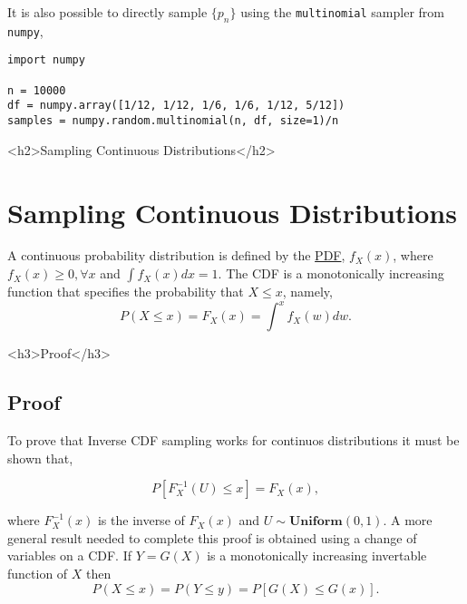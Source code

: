\documentclass[12pt]{article}
\begin{document}
\iftex
It is also possible to directly sample $\{p_n\}$ using the \texttt{multinomial} sampler from
\texttt{numpy},

\begin{verbatim}
import numpy

n = 10000
df = numpy.array([1/12, 1/12, 1/6, 1/6, 1/12, 5/12])
samples = numpy.random.multinomial(n, df, size=1)/n
\end{verbatim}
\fi

\ifblog
<h2>Sampling Continuous Distributions</h2>
\fi
\iftex
\section{Sampling Continuous Distributions}
\fi

A continuous probability distribution is defined by the  \href{https://en.wikipedia.org/wiki/Probability_density_function}{PDF},
$f_X(x)$, where $f_X(x) \geq 0, \forall x$ and $\int f_X(x) dx = 1.$ The CDF is a monotonically increasing function
that specifies the probability that $X \leq x$, namely,
\begin{equation}
\label{eq:continuous_cdf}
P(X \leq x) = F_X(x) = \int^{x} f_X(w) dw.
\end{equation}

\ifblog
<h3>Proof</h3>
\fi
\iftex
\subsection{Proof}
\fi

To prove that Inverse CDF sampling works for continuos distributions it must be shown that,

\begin{equation}
\label{eq:continuous_proof}
P[F_X^{-1}(U) \leq x] = F_X(x),
\end{equation}

where $F_X^{-1}(x)$ is the inverse of $F_X(x)$ and $U \sim \textbf{Uniform}(0, 1)$. A more general result needed to complete
this proof is obtained using a change of variables on a CDF. If $Y=G(X)$ is a monotonically increasing invertable function of $X$ then
\begin{equation}
\label{eq:CDF_invariance}
P(X \leq x) = P(Y \leq y) = P[G(X) \leq G(x)].
\end{equation}
\end{document}
